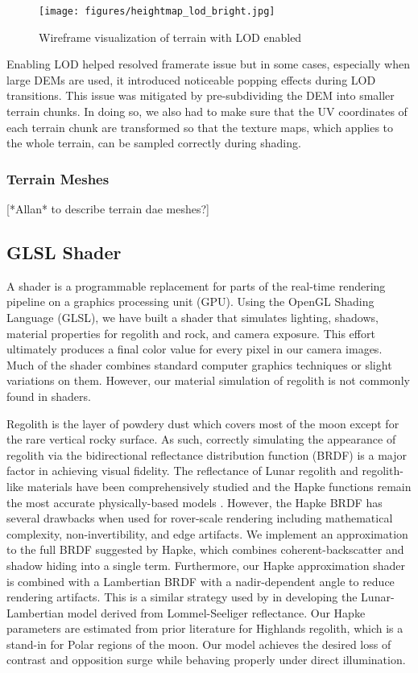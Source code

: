 \documentclass[twocolumn,letterpaper]{IEEEAerospaceCLS}  %
\begin{document}
\begin{figure}[h!]
	\texttt{[image: figures/heightmap\_lod\_bright.jpg]}
   	\caption{Wireframe visualization of terrain with LOD enabled}
    \label{fig:heightmaplod}
\end{figure}

Enabling LOD helped resolved framerate issue but in some cases, especially when large DEMs are used, it introduced noticeable popping effects during LOD transitions. 
This issue was mitigated by pre-subdividing the DEM into smaller terrain chunks. 
In doing so, we also had to make sure that the UV coordinates of each terrain chunk are transformed so that the texture maps, which applies to the whole terrain, can be sampled correctly during shading.

\subsubsection{Terrain Meshes}

[*Allan* to describe terrain dae meshes?]

\subsection{GLSL Shader}
A shader is a programmable replacement for parts of the real-time rendering pipeline on a graphics processing unit (GPU). 
Using the OpenGL Shading Language (GLSL), we have built a shader that simulates lighting, shadows, material properties for regolith and rock, and camera exposure. 
This effort ultimately produces a final color value for every pixel in our camera images. 
Much of the shader combines standard computer graphics techniques or slight variations on them. 
However, our material simulation of regolith is not commonly found in shaders.

Regolith is the layer of powdery dust which covers most of the moon except for the rare vertical rocky surface. 
As such, correctly simulating the appearance of regolith via the bidirectional reflectance distribution function (BRDF) is a major factor in achieving visual fidelity. 
The reflectance of Lunar regolith and regolith-like materials have been comprehensively studied and the Hapke functions remain the most accurate physically-based models \cite{hapke11}. 
However, the Hapke BRDF has several drawbacks when used for rover-scale rendering including mathematical complexity, non-invertibility, and edge artifacts\cite{Wong2012}. 
We implement an approximation to the full BRDF suggested by Hapke, which combines coherent-backscatter and shadow hiding into a single term. 
Furthermore, our Hapke approximation shader is combined with a Lambertian BRDF with a nadir-dependent angle to reduce rendering artifacts. 
This is a similar strategy used by \cite{McEwen1996} in developing the Lunar-Lambertian model derived from Lommel-Seeliger reflectance. 
Our Hapke parameters are estimated from prior literature for Highlands regolith, which is a stand-in for Polar regions of the moon. 
Our model achieves the desired loss of contrast and opposition surge while behaving properly under direct illumination.           
\end{document}

